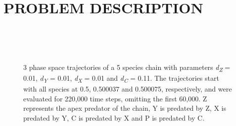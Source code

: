 \documentclass[letterpaper, 10 pt, conference]{ieeeconf}  %
\begin{document}
\section{PROBLEM DESCRIPTION}
\begin{figure}
  \centering
  \\
  \\
  \\
  \caption{\label{ref_label_overall}3 phase space trajectories of a 5 species chain with parameters \textit{d\textsubscript{Z}} = 0.01, \textit{d\textsubscript{Y}} = 0.01, \textit{d\textsubscript{X}} = 0.01 and \textit{d\textsubscript{C}} = 0.11. The trajectories start with all species at 0.5, 0.500037 and 0.500075, respectively, and were evaluated for 220,000 time steps, omitting the first 60,000. Z represents the apex predator of the chain, Y is predated by Z, X is predated by Y, C is predated by X and P is predated by C.}
\end{figure}
\end{document}
